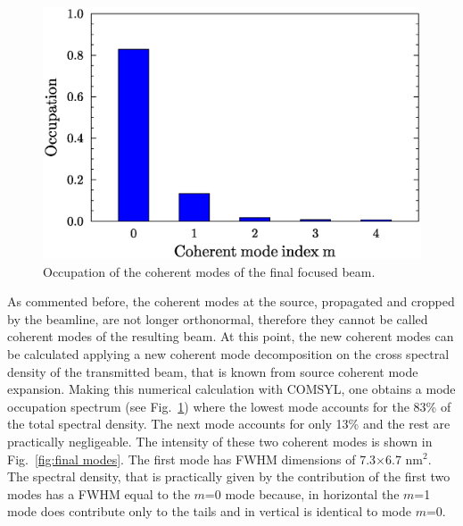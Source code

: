 \documentclass{iucr}              %
\begin{document}

\begin{figure}\label{fig:rediagonalization}
    \centering
        \includegraphics[width=\textwidth]{GRAPHICS/rediagonalized_modes.eps}
    \caption{Occupation of the coherent modes of the final focused beam.}
\end{figure}

As commented before, the coherent modes at the source, propagated and cropped by the beamline, are not longer orthonormal, therefore they cannot be called coherent modes of the resulting beam. At this point, the new coherent modes can be calculated applying a new coherent mode decomposition on the cross spectral density of the transmitted beam, that is known from source coherent mode expansion. Making this numerical calculation with COMSYL, one obtains a mode occupation spectrum (see Fig.~\ref{fig:rediagonalization}) where the lowest mode accounts for the 83\% of the total spectral density. The next mode accounts for only 13\% and the rest are practically negligeable. The intensity of these two coherent modes is shown in Fig.~\ref{fig:final modes}. The first mode has FWHM dimensions of 7.3$\times$6.7 nm$^2$. The spectral density, that is practically given by the contribution of the first two modes has a FWHM equal to the $m$=0 mode because, in horizontal the $m$=1 mode does contribute only to the tails and in vertical is identical to mode $m$=0.
\end{document}
